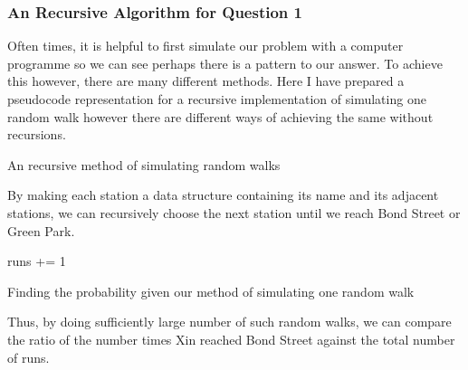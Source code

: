 \documentclass[]{article}
\begin{document}
\subsubsection{An Recursive Algorithm for Question
1}\label{an-recursive-algorithm-for-question-1}

Often times, it is helpful to first simulate our problem with a computer
programme so we can see perhaps there is a pattern to our answer. To
achieve this however, there are many different methods. Here I have
prepared a pseudocode representation for a recursive implementation of
simulating one random walk however there are different ways of achieving
the same without recursions.

\begin{algorithm}[H]
  \SetAlgoLined


  

 \caption{An recursive method of simulating random walks}
\end{algorithm}

By making each station a data structure containing its name and its
adjacent stations, we can recursively choose the next station until we
reach Bond Street or Green Park.

\begin{algorithm}[H]
  \SetAlgoLined

  \;

   {
    runs += 1\;
  }

 \caption{Finding the probability given our method of simulating one random walk}
\end{algorithm}

Thus, by doing sufficiently large number of such random walks, we can
compare the ratio of the number times Xin reached Bond Street against
the total number of runs.
\end{document}
